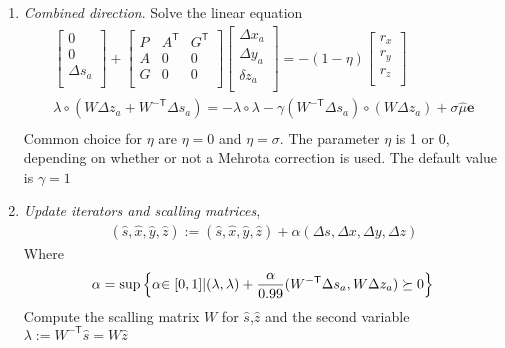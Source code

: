 \begin{enumerate}
    \item \textit{Combined direction}. Solve the linear equation\\
    	\begin{equation}
    		\begin{aligned}
    			\begin{bmatrix}
    				0\\
    				0\\
    				\Delta s_a\\
    			\end{bmatrix}
    			+
    			\begin{bmatrix}
        			P & A^\mathsf{T} & G^\mathsf{T}\\
        			A & 0 & 0\\
        			G & 0 & 0\\
    			\end{bmatrix}
    			\begin{bmatrix}
    				\Delta x_a\\
    				\Delta y_a\\
    				\delta z_a\\
    			\end{bmatrix}
    			=-(1-\eta)
    			\begin{bmatrix}
    				r_x\\
    				r_y\\
    				r_z\\
    			\end{bmatrix}\\
    			\lambda\circ(W\Delta {z_a} +W^{-\mathsf{T}}\Delta s_a ) = -\lambda \circ \lambda - \gamma(W^\mathsf{-T}\Delta s_a )\circ(W\Delta z_a)+\sigma\hat\mu\textbf{e}\\
    		\end{aligned}
    		\label{eqn:cvxopt_algorithm_3}
    	\end{equation}
    	Common choice for $\eta$ are $\eta=0$ and $\eta=\sigma$. The parameter $\eta$ is 1 or 0, depending on whether or not a Mehrota correction is used. The default value is $\gamma=1$
    \item \textit{Update iterators and scalling matrices},
    	\begin{equation*}
    		\begin{aligned}
    			(\hat s,\hat x,\hat y,\hat z):=(\hat s,\hat x,\hat y,\hat z)+\alpha(\Delta s,\Delta x,\Delta y,\Delta z)
    		\end{aligned}
    	\end{equation*}
    Where
    \begin{equation*}
    	\alpha = \textrm{sup} \left\{ {\alpha} {\in[0,1] } | (\lambda,\lambda)+\frac{\alpha}{0.99} ( W^{-\mathsf{T}} \Delta s_a, W\Delta z_a)\succeq 0\right\}\\
    \end{equation*}
    Compute the scalling matrix $W$ for $\hat s$,$\hat z$ and the second variable $\lambda :=W^\mathsf{-T}\hat s = W\hat z $  
\end{enumerate}

